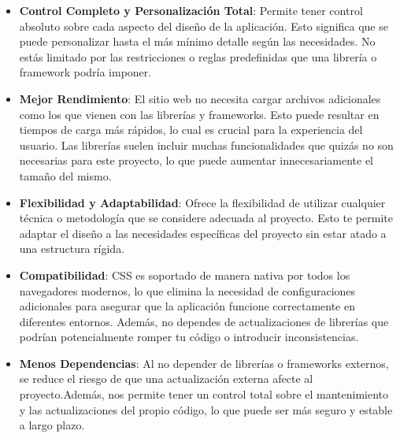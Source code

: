 \begin{itemize}

  \item \textbf{Control Completo y Personalización Total}: Permite tener control absoluto sobre cada aspecto del diseño de la aplicación. Esto significa que se puede personalizar hasta el más mínimo detalle según las necesidades. No estás limitado por las restricciones o reglas predefinidas que una librería o framework podría imponer.
  
  \item \textbf{Mejor Rendimiento}: El sitio web no necesita cargar archivos adicionales como los que vienen con las librerías y frameworks. Esto puede resultar en tiempos de carga más rápidos, lo cual es crucial para la experiencia del usuario. Las librerías suelen incluir muchas funcionalidades que quizás no son necesarias para este proyecto, lo que puede aumentar innecesariamente el tamaño del mismo.
  
  \item \textbf{Flexibilidad y Adaptabilidad}: Ofrece la flexibilidad de utilizar cualquier técnica o metodología que se considere adecuada al proyecto. Esto te permite adaptar el diseño a las necesidades específicas del proyecto sin estar atado a una estructura rígida.
  
  \item \textbf{Compatibilidad}: CSS es soportado de manera nativa por todos los navegadores modernos, lo que elimina la necesidad de configuraciones adicionales para asegurar que la aplicación funcione correctamente en diferentes entornos. Además, no dependes de actualizaciones de librerías que podrían potencialmente romper tu código o introducir inconsistencias.
  
  \item \textbf{Menos Dependencias}: Al no depender de librerías o frameworks externos, se reduce el riesgo de que una actualización externa afecte al proyecto.Además, nos permite tener un control total sobre el mantenimiento y las actualizaciones del propio código, lo que puede ser más seguro y estable a largo plazo.

  \end{itemize}